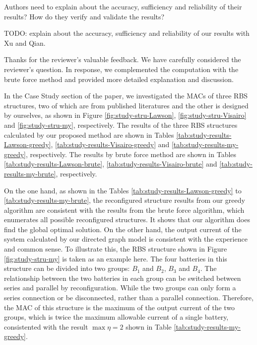 \begin{revcomment}
  Authors need to explain about the accuracy, sufficiency and reliability of their results? How do they verify and validate the results?
\end{revcomment}
\begin{revresponse}

TODO: explain about the accuracy, sufficiency and reliability of our results with Xu and Qian.

Thanks for the reviewer's valuable feedback. We have carefully considered the reviewer's question.
In response, we complemented the computation with the brute force method and provided more detailed explanation and discussion.


In the Case Study section of the paper, we investigated the MACs of three RBS structures, two of which are from published literatures \cite{lawsonSoftwareConfigurableBattery2012,visairoReconfigurableBatteryPack2008} and the other is designed by ourselves, as shown in Figure \ref{fig:study-stru-Lawson}, \ref{fig:study-stru-Visairo} and \ref{fig:study-stru-my}, respectively.
The results of the three RBS structures calculated by our proposed method are shown in Tables \ref{tab:study-results-Lawson-greedy}, \ref{tab:study-results-Visairo-greedy} and \ref{tab:study-results-my-greedy}, respectively.
The results by brute force method are shown in Tables \ref{tab:study-results-Lawson-brute}, \ref{tab:study-results-Visairo-brute} and \ref{tab:study-results-my-brute}, respectively.


On the one hand, as shown in the Tables \ref{tab:study-results-Lawson-greedy} to \ref{tab:study-results-my-brute}, the reconfigured structure results from our greedy algorithm are consistent with the results from the brute force algorithm, which enumerates all possible reconfigured structures.
It shows that our algorithm does find the global optimal solution.
On the other hand, the output current of the system calculated by our directed graph model is consistent with the experience and common sense.
To illustrate this, the RBS structure shown in Figure \ref{fig:study-stru-my} is taken as an example here.
The four batteries in this structure can be divided into two groups: $B_1$ and $B_2$, $B_3$ and $B_4$.
The relationship between the two batteries in each group can be switched between series and parallel by reconfiguration.
While the two groups can only form a series connection or be disconnected, rather than a parallel connection.
Therefore, the MAC of this structure is the maximum of the output current of the two groups, which is twice the maximum allowable current of a single battery, consistented with the result $\max \eta = 2$ shown in Table \ref{tab:study-results-my-greedy}.



\end{revresponse}
